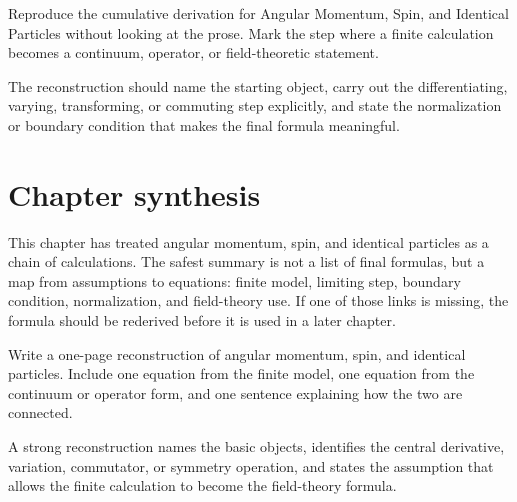 \begin{exercise}
Reproduce the cumulative derivation for Angular Momentum, Spin, and Identical Particles without looking at the prose.  Mark the step where a finite calculation becomes a continuum, operator, or field-theoretic statement.
\begin{answer}
The reconstruction should name the starting object, carry out the differentiating, varying, transforming, or commuting step explicitly, and state the normalization or boundary condition that makes the final formula meaningful.
\end{answer}
\end{exercise}



\section{Chapter synthesis}

This chapter has treated angular momentum, spin, and identical particles as a chain of calculations.  The safest summary is not a list of final formulas, but a map from assumptions to equations: finite model, limiting step, boundary condition, normalization, and field-theory use.  If one of those links is missing, the formula should be rederived before it is used in a later chapter.

\begin{exercise}
Write a one-page reconstruction of angular momentum, spin, and identical particles.  Include one equation from the finite model, one equation from the continuum or operator form, and one sentence explaining how the two are connected.
\begin{answer}
A strong reconstruction names the basic objects, identifies the central derivative, variation, commutator, or symmetry operation, and states the assumption that allows the finite calculation to become the field-theory formula.
\end{answer}
\end{exercise}
